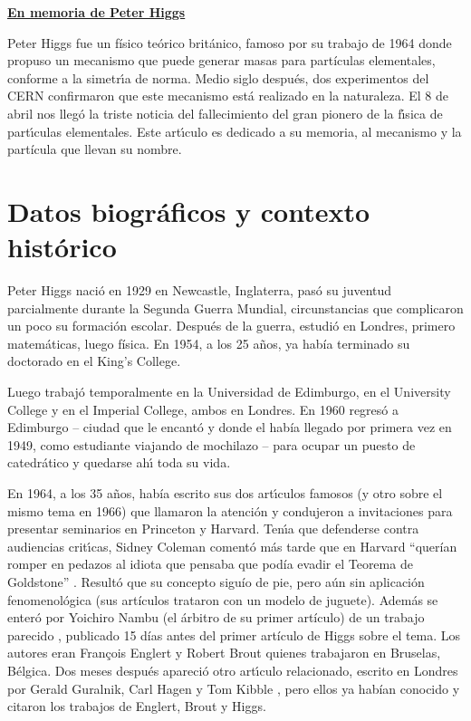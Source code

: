 \documentclass[12pt]{article}
\begin{document}
\begin{center}

{\Large{\underline{\bf En memoria de Peter Higgs}}} \vspace*{2mm} \\

\end{center}

\noindent
Peter Higgs fue un f\'isico te\'orico brit\'anico, famoso por su
trabajo de 1964 donde propuso un mecanismo que puede generar masas
para part\'iculas elementales, conforme a la simetr\'{\i}a de norma.
Medio siglo despu\'es, dos experimentos del CERN confirmaron
que este mecanismo est\'a realizado en la naturaleza.
El 8 de abril nos lleg\'{o} la triste noticia del fallecimiento del
gran pionero de la f\'{\i}sica de part\'{\i}culas elementales.
Este art\'{\i}culo es dedicado a su memoria, al mecanismo
y la part\'icula que llevan su nombre.

\section{Datos biogr\'aficos y contexto hist\'orico}

Peter Higgs nació en 1929 en Newcastle, Inglaterra, 
pas\'{o} su juventud parcialmente durante la Segunda Guerra Mundial,
circunstancias que complicaron un poco su formaci\'on escolar.
Despu\'es de la guerra, estudi\'o en Londres, primero matem\'aticas,
luego f\'isica. En 1954, a los 25 a\~nos, ya había terminado su doctorado en el King's College.

Luego trabaj\'{o} temporalmente en la Universidad de Edimburgo,
en el University College y en el Imperial College, ambos en Londres.
En 1960 regres\'{o} a Edimburgo -- ciudad que le encant\'o y donde
el hab\'ia llegado por primera vez en 1949, como estudiante viajando de mochilazo -- para ocupar un puesto de catedr\'{a}tico y quedarse
ah\'{\i} toda su vida.

En 1964, a los 35 a\~{n}os, había escrito sus dos art\'{\i}culos famosos
(y otro sobre el mismo tema en 1966) \cite{Higgs} que llamaron la atenci\'{o}n
y condujeron a invitaciones para presentar seminarios en Princeton
y Harvard. Ten\'{\i}a que defenderse contra audiencias crit\'{\i}cas,
Sidney Coleman coment\'{o} m\'{a}s tarde que en Harvard ``quer\'ian
romper en pedazos al idiota que pensaba que pod\'ia evadir el
Teorema de Goldstone'' \cite{boson}. Result\'{o} que su concepto siguío
de pie, pero aún sin aplicaci\'{o}n fenomenol\'{o}gica
(sus art\'iculos trataron con un modelo de juguete). Adem\'{a}s
se enter\'{o} por Yoichiro Nambu (el árbitro de su primer art\'iculo)
de un trabajo parecido \cite{EB}, publicado
15 d\'ias antes del primer art\'iculo de Higgs sobre el tema.
Los autores eran Fran\c{c}ois Englert y Robert Brout quienes
trabajaron en Bruselas, B\'elgica. Dos meses despu\'{e}s apareci\'{o}
otro art\'{\i}culo relacionado, escrito en Londres por
Gerald Guralnik, Carl Hagen y Tom Kibble \cite{GHK}, pero ellos ya habían
conocido y citaron los trabajos de Englert, Brout y Higgs.
\end{document}
